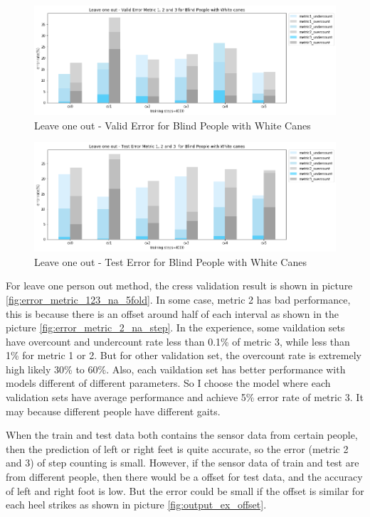 \documentclass[11pt]{article}
\begin{document}
{\begin{figure}[ht]
\centering
\includegraphics[scale=0.5]{error_metric_wc_10fold_valid4000}
\caption{Leave one out - Valid Error for Blind People with White Canes}
\label{fig:error_metric_wc_10fold_valid4000}
\end{figure}


\begin{figure}[ht]
\centering
\includegraphics[scale=0.5]{error_metric_wc_10fold_test4000}
\caption{Leave one out - Test Error for Blind People with White Canes}
\label{fig:error_metric_wc_10fold_test4000}
\end{figure}

For leave one person out method, the cress validation result is shown in picture \ref{fig:error_metric_123_na_5fold}. In some case, metric 2 has bad performance, this is because there is an offset around half of each interval as shown in the picture  \ref{fig:error_metric_2_na_step}. In the experience, some vaildation sets have overcount and undercount rate less than 0.1\% of metric 3, while less than 1\% for metric 1 or 2. But for other validation set, the overcount rate is extremely high likely 30\% to 60\%. Also, each vaildation set has better performance with models different of different parameters. So I choose the model where each validation sets have average performance and achieve 5\% error rate of metric 3. It may because different people have different gaits.


When the train and test data both contains the sensor data from certain people, then the prediction of left or right feet is quite accurate, so the error (metric 2 and 3) of step counting is small. However, if the sensor data of train and test are from different people, then there would be a offset for test data, and the accuracy of left and right foot is low. But the error could be small if the offset is similar for each heel strikes as shown in picture \ref{fig:output_ex_offset}. 

}
\end{document}
